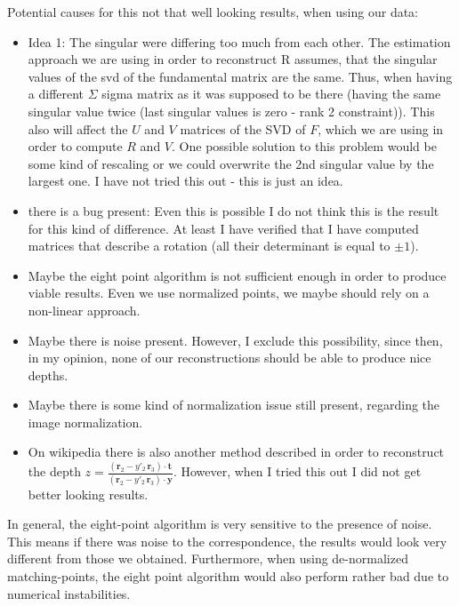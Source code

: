 \documentclass{paper}
\begin{document}
Potential causes for this not that well looking results, when using our data:
\begin{itemize}
    \item Idea 1: The singular were differing too much from each other. The estimation approach we are using in order to reconstruct R assumes, that the singular values of the svd of the fundamental matrix are the same. Thus, when having a different $\Sigma$ sigma matrix as it was supposed to be there (having the same singular value twice (last singular values is zero - rank 2 constraint)). This also will affect the $U$ and $V$ matrices of the SVD of $F$, which we are using in order to compute $R$ and $V$. One possible solution to this problem would be some kind of rescaling or we could overwrite the 2nd singular value by the largest one. I have not tried this out - this is just an idea.
    \item there is a bug present: Even this is possible I do not think this is the result for this kind of difference. At least I have verified that I have computed matrices that describe a rotation (all their determinant is equal to $\pm 1$).
    \item Maybe the eight point algorithm is not sufficient enough in order to produce viable results. Even we use normalized points, we maybe should rely on a non-linear approach.
    \item Maybe there is noise present. However, I exclude this possibility, since then, in my opinion, none of our reconstructions should be able to produce nice depths.
    \item Maybe there is some kind of normalization issue still present, regarding the image normalization.
    \item On wikipedia there is also another method described in order to reconstruct the depth $z = \frac{ (\mathbf{r}_{2} - y'_{2} \, \mathbf{r}_{3}) \cdot \mathbf{t} }{ (\mathbf{r}_{2} - y'_{2} \, \mathbf{r}_{3}) \cdot \mathbf{y} } $. However, when I tried this out I did not get better looking results.
\end{itemize}

In general, the eight-point algorithm is very sensitive to the presence of noise. This means if there was noise to the correspondence, the results would look very different from those we obtained. Furthermore, when using de-normalized matching-points, the eight point algorithm would also perform rather bad due to numerical instabilities.
\end{document}
